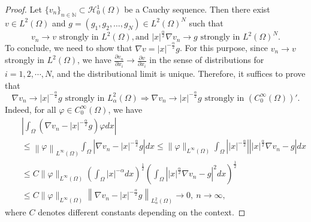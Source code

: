 \documentclass[11pt]{article}
\newtheorem{lemma}{Lemma}[section]
\numberwithin{equation}{section}
\def\ra{\rightarrow}
\def\mb{\mathbb}
\def\Om{\Omega}
\def\mcH{\mathcal{H}}
\begin{document}
\begin{proof}
			Let $\{v_n\}_{n\in\mb{N}}\subset\mcH_0^1(\Omega)$  be a Cauchy sequence. Then there exist $v\in L^2(\Omega)$ and  $g=(g_1,g_2,\dots,g_N)\in L^2(\Omega)^N$ such that
			\begin{equation*}
				v_n\ra v \mbox{ strongly in } L^2(\Om), \mbox{and } |x|^{\frac{\alpha}{2}}\nabla v_n \ra g \mbox{ strongly in } L^2(\Omega)^N.
			\end{equation*}
			To conclude, we need to show that $\nabla v = |x|^{-\frac{\alpha}{2}}g$.  For this purpose, since
			$v_n\ra v  $  strongly in $L^2(\Omega)$,  we have $\frac{\partial v_n}{\partial x_i}\rightarrow \frac{\partial v}{\partial x_i}$
			in the sense of distributions for $i=1,2,\cdots, N$, and the distributional limit is unique. Therefore, it suffices to prove that
			\begin{equation*}
				\nabla v_n\ra |x|^{-\frac{\alpha}{2}}g  \mbox{ strongly in } L_\alpha^2(\Om) \Rightarrow \nabla v_n\ra  |x|^{-\frac{\alpha}{2}}g \mbox{ strongly in } (C_0^\infty(\Omega))'.
			\end{equation*}
			Indeed,
			for all $\varphi\in C_0^\infty(\Omega)$,  we have
			\begin{eqnarray*}
				&&\left|\int_\Om (\nabla v_n  - |x|^{-\frac{\alpha}{2}}g)\varphi dx \right|\\
				&&\le \left\| \varphi\right\|_{L^\infty (\Om)}  \int_{\Om} \left| \nabla v_n  - |x|^{-\frac{\alpha}{2}}g \right| dx\le\|\varphi\|_{L^\infty(\Om)}\int_\Om \left||x|^{-\frac{\alpha}{2}}\right| \left||x|^\frac{\alpha}{2}\nabla v_n-g\right|dx\\
				&&\le C\|\varphi\|_{L^\infty(\Om)}\left(\int_\Om |x|^{-\alpha}d x\right)^\frac{1}{2}\left(\int_\Om \left||x|^\frac{\alpha}{2}\nabla v_n-g\right|^2dx\right)^\frac{1}{2}\\
				&&\le C\|\varphi\|_{L^\infty(\Om)}\left\|\nabla v_n-|x|^{-\frac{\alpha}{2}}g\right\|_{L_\alpha^2(\Om)}\rightarrow 0, \ n\rightarrow\infty,
			\end{eqnarray*}
			where $C$ denotes different constants depending on the context.
		\end{proof}
%		
%		
\end{document}
